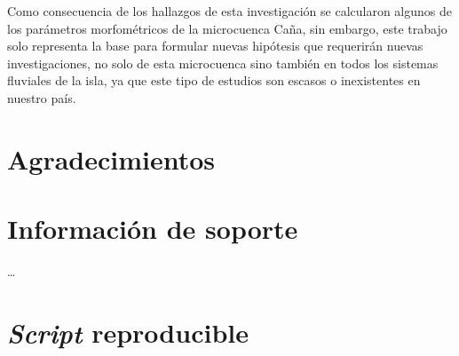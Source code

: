 \documentclass[11pt,]{article}
\begin{document}
Como consecuencia de los hallazgos de esta investigación se calcularon
algunos de los parámetros morfométricos de la microcuenca Caña, sin
embargo, este trabajo solo representa la base para formular nuevas
hipótesis que requerirán nuevas investigaciones, no solo de esta
microcuenca sino también en todos los sistemas fluviales de la isla, ya
que este tipo de estudios son escasos o inexistentes en nuestro país.

\section{Agradecimientos}\label{agradecimientos}

\section{Información de soporte}\label{informaciuxf3n-de-soporte}

\ldots

\section{\texorpdfstring{\emph{Script}
reproducible}{Script reproducible}}\label{script-reproducible}
\end{document}
